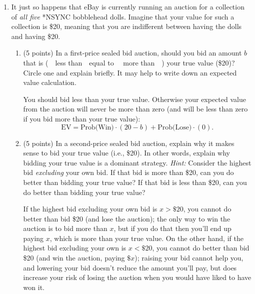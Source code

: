 \documentclass[twoside]{article}
\begin{document}
\begin{enumerate}
\item \begin{EXAM} It just so happens that eBay is currently running an auction for a collection of \emph{all five} *NSYNC bobblehead dolls. Imagine that your value for such a collection is \$20, meaning that you are indifferent between having the dolls and having \$20. \end{EXAM}

    \begin{enumerate}
    \item \begin{EXAM} (5 points) In a first-price sealed bid auction, should you bid an amount $b$ that is (\ \ less than\ \ equal to \ \ more than\ \ ) your true value (\$20)? Circle one and explain briefly. It may help to write down an expected value calculation.     \clearpage \end{EXAM}

\begin{KEY}
You should bid less than your true value. Otherwise your expected value from the auction will never be more than zero (and will be less than zero if you bid more than your true value):
\[
\mbox{EV}=\mbox{Prob(Win)}\cdot (20-b) + \mbox{Prob(Lose)}\cdot (0).
\]
\end{KEY}



    \item \begin{EXAM} (5 points) In a second-price sealed bid auction, explain why it makes sense to bid your true value (i.e., \$20). In other words, explain why bidding your true value is a %
dominant strategy. \emph{Hint: }Consider the highest bid \emph{excluding} your own bid. If that bid is more than \$20, can you do better than bidding your true value? If that bid is less than \$20, can you do better than bidding your true value? \vspace{3in}\end{EXAM}

\begin{KEY}
If the highest bid excluding your own bid is $x>\$20$, you cannot do better than bid \$20 (and lose the auction); the only way to win the auction is to bid more than $x$, but if you do that then you'll end up paying $x$, which is more than your true value. On the other hand, if the highest bid excluding your own is $x<\$20$, you cannot do better than bid \$20 (and win the auction, paying $\$x$); raising your bid cannot help you, and lowering your bid doesn't reduce the amount you'll pay, but does increase your risk of losing the auction when you would have liked to have won it.
\end{KEY}





\end{enumerate}
\end{enumerate}
\end{document}
